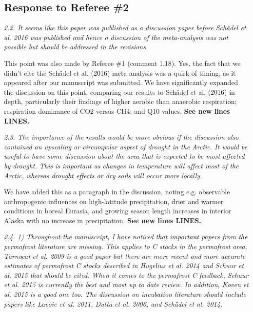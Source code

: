 \documentclass[11pt, oneside]{article}
\begin{document}
\newpage
\subsection*{Response to Referee \#2}

{\it 2.2. It seems like this paper was published as a discussion paper before Schädel et al. 2016 was published and hence a discussion of the meta-analysis was not possible but should be addressed in the revisions. }

This point was also made by Referee \#1 (comment 1.18). Yes, the fact that we didn't cite the Schädel et al. (2016) meta-analysis was a quirk of timing, as it appeared after our manuscript was submitted. We have significantly expanded the discussion on this point, comparing our results to Schädel et al. (2016) in depth, particularly their findings of higher aerobic than anaerobic respiration; respiration dominance of CO2 versus CH4; and Q10 values. {\bf See new lines LINES.}

\medskip
{\it 2.3. The importance of the results would be more obvious if the discussion also contained an upscaling or circumpolar aspect of drought in the Arctic. It would be useful to have some discussion about the area that is expected to be most affected by drought. This is important as changes in temperature will affect most of the Arctic, whereas drought effects or dry soils will occur more locally. }

We have added this as a paragraph in the discussion, noting e.g. observable anthropogenic influences on high-latitude precipitation, drier and warmer conditions in boreal Eurasia, and growing season length increases in interior Alaska with no increase in precipitation. {\bf See new lines LINES.}

\medskip
{\it 2.4. 1) Throughout the manuscript, I have noticed that important papers from the permafrost literature are missing. This applies to C stocks in the permafrost area, Tarnocai et al. 2009 is a good paper but there are more recent and more accurate estimates of permafrost C stocks described in Hugelius et al. 2014 and Schuur et al. 2015 that should be cited. When it comes to the permafrost C feedback, Schuur et al. 2015 is currently the best and most up to date review. In addition, Koven et al. 2015 is a good one too. The discussion on incubation literature should include papers like Lavoie et al. 2011, Dutta et al. 2006, and Schädel et al. 2014. }
\end{document}
